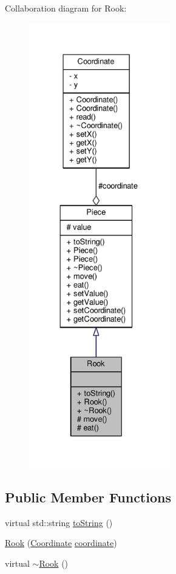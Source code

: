 Collaboration diagram for Rook\+:
\nopagebreak
\begin{figure}[H]
\begin{center}
\leavevmode
\includegraphics[height=550pt]{class_rook__coll__graph}
\end{center}
\end{figure}
\subsection*{Public Member Functions}
\begin{DoxyCompactItemize}
\item 
virtual std\+::string \hyperlink{class_rook_a6b9d17ae219d74742a7deacf52aa4641}{to\+String} ()
\item 
\hyperlink{class_rook_afbcd69bc8c1a497b7656ddef8ec371f2}{Rook} (\hyperlink{class_coordinate}{Coordinate} \hyperlink{class_piece_a9e92373c8fffc1f5efb20d62204b70cf}{coordinate})
\item 
virtual \hyperlink{class_rook_a70d445b94848b22ded850b6f58bc2972}{$\sim$\+Rook} ()
\end{DoxyCompactItemize}
